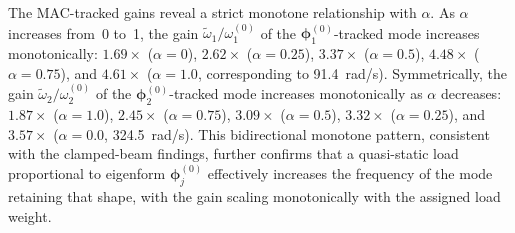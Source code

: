 \documentclass[pdflatex,lineno,sn-mathphys-ay]{sn-jnl}
\begin{document}
The MAC-tracked gains reveal a strict monotone relationship with $\alpha$. As $\alpha$ increases from~0 to~1, the gain $\tilde{\omega}_1/\omega_1^{(0)}$ of the $\boldsymbol{\phi}_1^{(0)}$-tracked mode increases monotonically: $1.69\times$ ($\alpha=0$), $2.62\times$ ($\alpha=0.25$), $3.37\times$ ($\alpha=0.5$), $4.48\times$ ($\alpha=0.75$), and $4.61\times$ ($\alpha=1.0$, corresponding to 91.4~rad/s). Symmetrically, the gain $\tilde{\omega}_2/\omega_2^{(0)}$ of the $\boldsymbol{\phi}_2^{(0)}$-tracked mode increases monotonically as $\alpha$ decreases: $1.87\times$ ($\alpha=1.0$), $2.45\times$ ($\alpha=0.75$), $3.09\times$ ($\alpha=0.5$), $3.32\times$ ($\alpha=0.25$), and $3.57\times$ ($\alpha=0.0$, 324.5~rad/s). This bidirectional monotone pattern, consistent with the clamped-beam findings, further confirms that a quasi-static load proportional to eigenform $\boldsymbol{\phi}_j^{(0)}$ effectively increases the frequency of the mode retaining that shape, with the gain scaling monotonically with the assigned load weight.
\end{document}
